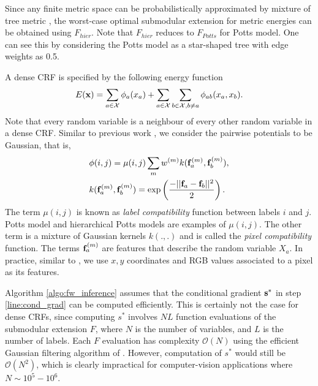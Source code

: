 Since any finite metric space can be probabilistically approximated by mixture
of tree metric \citep{bartal1996probabilistic}, the worst-case optimal
submodular extension for metric energies can be obtained using $F_{hier}$. Note
that $F_{hier}$ reduces to $F_{Potts}$ for Potts model. One can see this by
considering the Potts model as a star-shaped tree with edge weights as 0.5.

\label{subsec:dense_crf}

 A dense CRF is specified by the following energy function 
\begin{equation}
    E({\bf x}) = \sum_{a \in {\mathcal X}} \phi_a(x_a) + \sum_{a \in {\mathcal X}} \sum_{b \in {\mathcal X}, b \neq a} \phi_{ab}(x_a, x_b).
\end{equation}
Note that every random variable is a neighbour of every other random variable in a dense CRF. Similar to previous work \citep{koltun2011efficient}, we consider the pairwise potentials to be Gaussian, that is, 
\begin{align}
    &\phi(i, j) = \mu(i, j) \sum_{m} w^{(m)} k({\bf f}_a^{(m)}, {\bf f}_b^{(m)}), \\
    &k({\bf f}_a^{(m)}, {\bf f}_b^{(m)}) = \exp\left( \frac{- ||{\bf f}_a - {\bf f}_b ||^2}{2} \right).
\end{align}
The term $\mu(i,j)$ is known as {\it label compatibility} function between
labels $i$ and $j$. Potts model and hierarchical Potts models are examples of
$\mu(i, j)$. The other term is a mixture of Gaussian kernels $k(.,.)$ and is
called the {\it pixel compatibility} function. The terms ${\bf f}_a^{(m)}$ are
features that describe the random variable $X_a$. In practice, similar to
\citep{koltun2011efficient}, we use $x, y$ coordinates and RGB values
associated to a pixel as its features.

Algorithm \ref{algo:fw_inference} assumes that the conditional gradient $\bf s^*$ in step {\ref{line:cond_grad}} can be computed efficiently. This is certainly not the case for dense CRFs, since computing $s^*$ involves $NL$ function evaluations of the submodular extension $F$, where $N$ is the number of variables, and $L$ is the number of labels. Each $F$ evaluation has complexity ${\mathcal O}(N)$ using the efficient Gaussian filtering algorithm of \citep{koltun2011efficient}. However, computation of $s^*$ would still be ${\mathcal O} (N^2)$, which is clearly impractical for computer-vision applications where $N \sim 10^5 - 10^6$.

